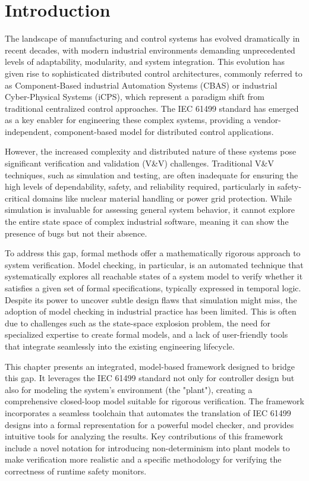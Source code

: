 \section{Introduction}\label{sec:introduction}

The landscape of manufacturing and control systems has evolved dramatically in recent decades, with modern industrial environments demanding unprecedented levels of adaptability, modularity, and system integration. This evolution has given rise to sophisticated distributed control architectures, commonly referred to as Component-Based industrial Automation Systems (CBAS) or industrial Cyber-Physical Systems (iCPS), which represent a paradigm shift from traditional centralized control approaches. The IEC 61499 standard has emerged as a key enabler for engineering these complex systems, providing a vendor-independent, component-based model for distributed control applications.

However, the increased complexity and distributed nature of these systems pose significant verification and validation (V\&V) challenges. Traditional V\&V techniques, such as simulation and testing, are often inadequate for ensuring the high levels of dependability, safety, and reliability required, particularly in safety-critical domains like nuclear material handling or power grid protection. While simulation is invaluable for assessing general system behavior, it cannot explore the entire state space of complex industrial software, meaning it can show the presence of bugs but not their absence.

To address this gap, formal methods offer a mathematically rigorous approach to system verification. Model checking, in particular, is an automated technique that systematically explores all reachable states of a system model to verify whether it satisfies a given set of formal specifications, typically expressed in temporal logic. Despite its power to uncover subtle design flaws that simulation might miss, the adoption of model checking in industrial practice has been limited. This is often due to challenges such as the state-space explosion problem, the need for specialized expertise to create formal models, and a lack of user-friendly tools that integrate seamlessly into the existing engineering lifecycle.

This chapter presents an integrated, model-based framework designed to bridge this gap. It leverages the IEC 61499 standard not only for controller design but also for modeling the system's environment (the "plant"), creating a comprehensive closed-loop model suitable for rigorous verification. The framework incorporates a seamless toolchain that automates the translation of IEC 61499 designs into a formal representation for a powerful model checker, and provides intuitive tools for analyzing the results. Key contributions of this framework include a novel notation for introducing non-determinism into plant models to make verification more realistic and a specific methodology for verifying the correctness of runtime safety monitors.

